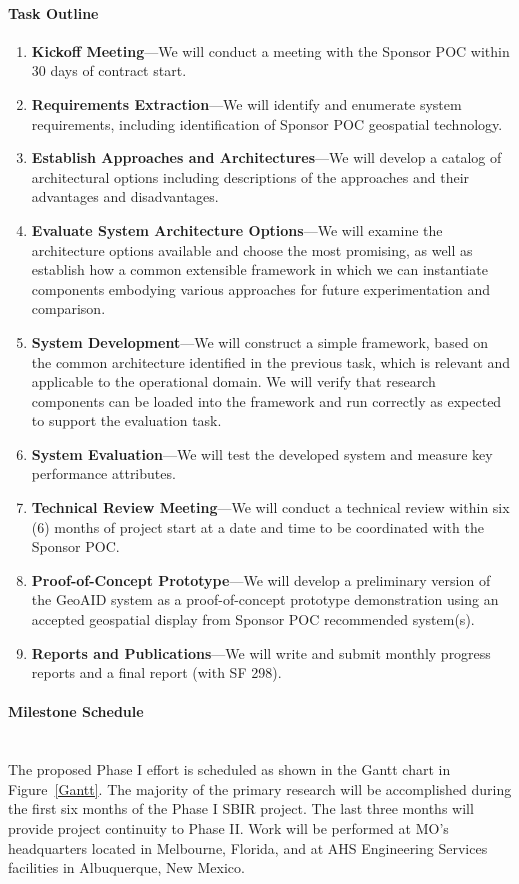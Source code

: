 \documentclass{sbir}
\begin{document}
\paragraph{Task Outline} 
\begin{enumerate}
\vspace{-0.1in}
\item {\bf Kickoff Meeting}---We will conduct a meeting with the Sponsor POC within 30 days of contract start.
\item {\bf Requirements Extraction}---We will identify and enumerate system requirements, including identification of Sponsor POC geospatial technology.
\item {\bf Establish Approaches and Architectures}---We will develop a catalog of architectural options including descriptions of the approaches and their advantages and disadvantages.
\item {\bf Evaluate System Architecture Options}---We will examine the architecture options available and choose the most promising, as well as establish how a common extensible framework in which we can instantiate components embodying various approaches for future experimentation and comparison.
\item {\bf System Development}---We will construct a simple framework, based on the common architecture identified in the previous task, which is relevant and applicable to the operational domain. We will verify that research components can be loaded into the framework and run correctly as expected to support the evaluation task.
\item {\bf System Evaluation}---We will test the developed system and measure key performance attributes.
\item {\bf Technical Review Meeting}---We will conduct a technical review within six (6) months of project start at a date and time to be coordinated with the Sponsor POC.
\item {\bf Proof-of-Concept Prototype}---We will develop a preliminary version of the GeoAID system as a proof-of-concept prototype demonstration using an accepted geospatial display from Sponsor POC recommended system(s).
\item {\bf Reports and Publications}---We will write and submit monthly progress reports and a final report (with SF 298).
\end{enumerate}

\paragraph{Milestone Schedule}~\\
The proposed Phase I effort is scheduled as shown in the Gantt chart in Figure~\ref{Gantt}. The majority of the primary research will be accomplished during the first six months of the Phase I SBIR project. The last three months will provide project continuity to Phase II. Work will be performed at MO's headquarters located in Melbourne, Florida, and at AHS Engineering Services facilities in Albuquerque, New Mexico.
\end{document}

